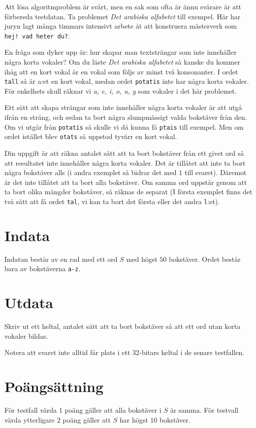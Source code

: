 Att lösa algoritmproblem är svårt, men en sak som ofta är ännu svårare är att förbereda
testdatan. Ta problemet \textit{Det arabiska alfabetet} till exempel. Här har juryn lagt
många timmars intensivt arbete åt att konstruera mästerverk som \texttt{hej! vad heter du?}.


En fråga som dyker upp är: hur skapar man textsträngar som inte innehåller några korta vokaler?
Om du läste \textit{Det arabiska alfabetet} så kanske du kommer ihåg att en kort vokal är en
vokal som följs av minst två konsonanter. I ordet \texttt{tall} så är a:et en kort vokal, medan
ordet \texttt{potatis} inte har några korta vokaler. För enkelhets skull räknar vi  \textit{a, e, i, o, u, y} 
som vokaler i det här problemet.


Ett sätt att skapa strängar som inte innehåller några korta vokaler är att utgå ifrån en sträng,
och sedan ta bort några slumpmässigt valda bokstäver från den. Om vi utgår från \texttt{potatis} så 
skulle vi då kunna få \texttt{ptais} till exempel. Men om ordet istället blev \texttt{otats} så uppstod
tyvärr en kort vokal.


Din uppgift är att räkna antalet sätt att ta bort bokstäver från ett givet ord så att resultatet inte
innehåller några korta vokaler. Det är tillåtet att inte ta bort några bokstäver alls (i andra exemplet
så bidrar det med $1$ till svaret). Däremot är det inte tillåtet att ta bort alla bokstäver. Om samma ord
uppstår genom att ta bort olika mängder bokstäver, så räknas de separat (I första exemplet finns det två sätt
att få ordet \texttt{tal}, vi kan ta bort det första eller det andra \texttt{l}:et).

\section*{Indata}
Indatan består av en rad med ett ord $S$ med högst $50$ bokstäver. Ordet består bara av bokstäverna \texttt{a-z}.

\section*{Utdata}
Skriv ut ett heltal, antalet sätt att ta bort bokstäver så att ett ord utan korta vokaler bildas.

Notera att svaret inte alltid får plats i ett $32$-bitars heltal i de senare testfallen.

\section*{Poängsättning}
För testfall värda $1$ poäng gäller att alla bokstäver i $S$ är samma.
För testvall värda ytterligare $2$ poäng gäller att $S$ har högst $10$ bokstäver.
